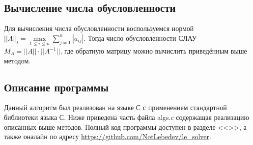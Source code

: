 \documentclass[a4paper,12pt,titlepage,finall]{article}
\begin{document}
\subsection{Вычисление числа обусловленности}
Для вычисления числа обусловленности воспользуемся нормой $||A||_l = \max\limits_{1 \leq i \leq n} \sum\limits_{j=1}^n |a_{ij}|$. Тогда число обусловленности СЛАУ $M_A=||A|| \cdot ||A^{-1}||$, где обратную матрицу можно вычислить приведённым выше методом.
\subsection{Описание программы}
Данный алгоритм был реализован на языке С с применением стандартной библиотеки языка С. Ниже приведена часть файла algs.c содержащая реализацию описанных выше методов. Полный код программы доступен в разделе <<>>, а также оналайн по адресу \url{https://github.com/NotLebedev/le_solver}.

\end{document}
